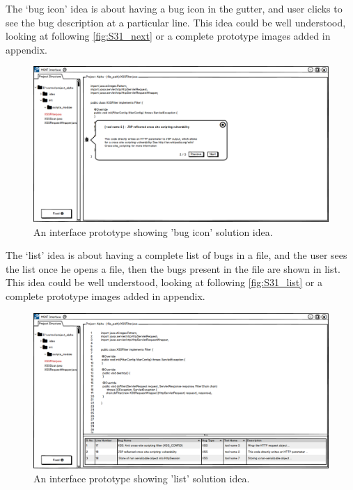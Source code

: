 The ‘bug icon’ idea is about having a bug icon in the gutter, and user clicks to see the bug description at a particular line. This idea could be well understood, looking at following \autoref{fig:S31_next} or a complete prototype images added in appendix. \\


\begin{figure}[hbt!]
	\centering
	\includegraphics[width=\linewidth]{figures/solution_ideas_snaps/S31_next}
	\caption{An interface prototype showing 'bug icon' solution idea.}
	\label{fig:S31_next}
\end{figure} 

The ‘list’ idea is about having a complete list of bugs in a file, and the user sees the list once he opens a file, then the bugs present in the file are shown in list. This idea could be well understood, looking at following \autoref{fig:S31_list} or a complete prototype images added in appendix. \\


\begin{figure}[hbt!]
	\centering
	\includegraphics[width=\linewidth]{figures/solution_ideas_snaps/S31_list}
	\caption{An interface prototype showing 'list' solution idea.}
	\label{fig:S31_list}
\end{figure} 

